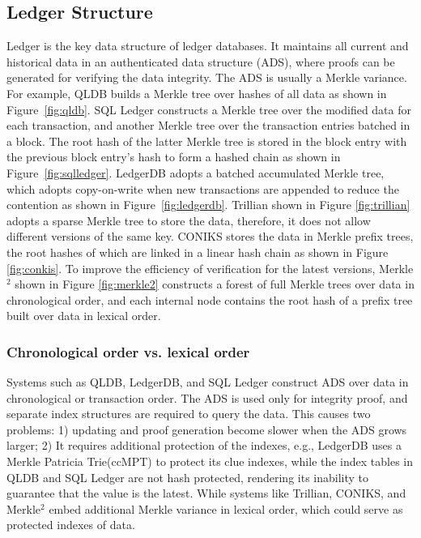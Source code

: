 \documentclass[11pt,dvipdfm]{article}
\begin{document}
\subsection{Ledger Structure}

Ledger is the key data structure of ledger databases. It maintains all current and historical data in an authenticated data structure (ADS), where proofs can be generated for verifying the data integrity. The ADS is usually a Merkle variance. For example, QLDB builds a Merkle tree over hashes of all data as shown in Figure~\ref{fig:qldb}. SQL Ledger constructs a Merkle tree over the modified data for each transaction, and another Merkle tree over the transaction entries batched in a block. The root hash of the latter Merkle tree is stored in the block entry with the previous block entry's hash to form a hashed chain as shown in Figure~\ref{fig:sqlledger}. LedgerDB adopts a batched accumulated Merkle tree, which adopts copy-on-write when new transactions are appended to reduce the contention as shown in Figure~\ref{fig:ledgerdb}. Trillian shown in Figure \ref{fig:trillian} adopts a sparse Merkle tree to store the data, therefore, it does not allow different versions of the same key. CONIKS stores the data in Merkle prefix trees, the root hashes of which are linked in a linear hash chain as shown in Figure \ref{fig:conkis}. To improve the efficiency of verification for the latest versions, Merkle$^2$ shown in Figure \ref{fig:merkle2} constructs a forest of full Merkle trees over data in chronological order, and each internal node contains the root hash of a prefix tree built over data in lexical order.

\subsubsection{Chronological order vs. lexical order}
Systems such as QLDB, LedgerDB, and SQL Ledger construct ADS over data in chronological or transaction order. The ADS is used only for integrity proof, and separate index structures are required to query the data. 
This causes two problems: 1) updating and proof generation become slower when the ADS grows larger; 2) It requires additional protection of the indexes, e.g., LedgerDB uses a Merkle Patricia Trie(ccMPT) to protect its clue indexes, while the index tables in QLDB and SQL Ledger are not hash protected, rendering its inability to guarantee that the value is the latest.
While systems like Trillian, CONIKS, and Merkle$^2$ embed additional Merkle variance in lexical order, which could serve as protected indexes of data.
\end{document}
